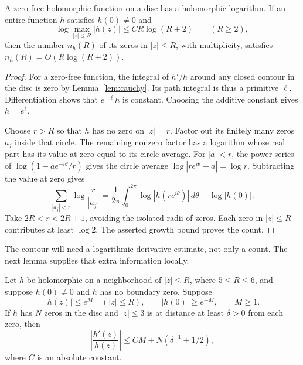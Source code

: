 \begin{lemma}
\label{lem:jensen}
A zero-free holomorphic function on a disc has a holomorphic logarithm.
If an entire function $h$ satisfies $h(0)\ne0$ and
\[
 \log\max_{|z|\leq R}|h(z)|\leq C R\log(R+2)\qquad(R\geq2),
\]
then the number $n_h(R)$ of its zeros in $|z|\leq R$, with multiplicity,
satisfies $n_h(R)=O(R\log(R+2))$.
\end{lemma}

\begin{proof}
For a zero-free function, the integral of $h'/h$ around any closed contour
in the disc is zero by Lemma~\ref{lem:cauchy}.  Its path integral is thus a
primitive $\ell$.  Differentiation shows that $e^{-\ell}h$ is constant.
Choosing the additive constant gives $h=e^\ell$.

Choose $r>R$ so that $h$ has no zero on $|z|=r$.
Factor out its finitely many zeros $a_j$ inside that circle.
The remaining nonzero factor has a logarithm whose real part has its value
at zero equal to its circle average.
For $|a|<r$, the power series of $\log(1-ae^{-i\theta}/r)$ gives
the circle average $\log|re^{i\theta}-a|=\log r$.
Subtracting the value at zero gives
\[
 \sum_{|a_j|<r}\log\frac r{|a_j|}
 =\frac1{2\pi}\int_0^{2\pi}\log|h(re^{i\theta})|\,d\theta
       -\log|h(0)|.
\]
Take $2R<r<2R+1$, avoiding the isolated radii of zeros.
Each zero in $|z|\leq R$ contributes at least $\log2$.
The asserted growth bound proves the count.
\end{proof}

The contour will need a logarithmic derivative estimate, not only a count.
The next lemma supplies that extra information locally.

\begin{lemma}
\label{lem:local-log}
Let $h$ be holomorphic on a neighborhood of $|z|\leq R$, where
$5\leq R\leq6$, and suppose $h(0)\ne0$ and $h$ has no boundary zero.
Suppose
\[
 |h(z)|\leq e^M\quad(|z|\leq R),\qquad |h(0)|\geq e^{-M},\qquad M\geq1.
\]
If $h$ has $N$ zeros in the disc and $|z|\leq3$ is at distance at least
$\delta>0$ from each zero, then
\[
 \left|\frac{h'(z)}{h(z)}\right|
 \leq C M+N(\delta^{-1}+1/2),
\]
where $C$ is an absolute constant.
\end{lemma}

